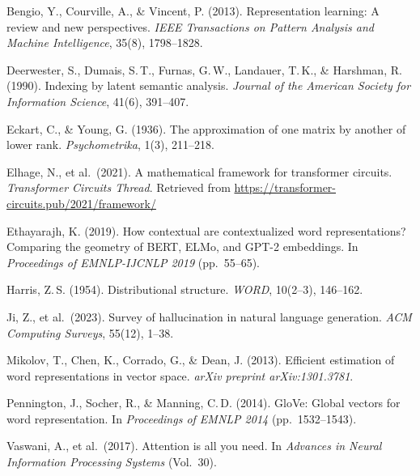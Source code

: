 \documentclass[12pt,a4paper]{article}
\begin{document}
\begin{enumerate}[label={[\arabic*]}, itemsep=6pt]
    \item Bengio, Y., Courville, A., \& Vincent, P. (2013). Representation learning: A review and
          new perspectives. \textit{IEEE Transactions on Pattern Analysis and Machine Intelligence},
          35(8), 1798--1828.

    \item Deerwester, S., Dumais, S.\,T., Furnas, G.\,W., Landauer, T.\,K., \& Harshman, R.
          (1990). Indexing by latent semantic analysis. \textit{Journal of the American Society for
          Information Science}, 41(6), 391--407.

    \item Eckart, C., \& Young, G. (1936). The approximation of one matrix by another of lower
          rank. \textit{Psychometrika}, 1(3), 211--218.

    \item Elhage, N., et al.\ (2021). A mathematical framework for transformer circuits.
          \textit{Transformer Circuits Thread}. Retrieved from
          \url{https://transformer-circuits.pub/2021/framework/}

    \item Ethayarajh, K. (2019). How contextual are contextualized word representations?
          Comparing the geometry of BERT, ELMo, and GPT-2 embeddings. In
          \textit{Proceedings of EMNLP-IJCNLP 2019} (pp.\ 55--65).

    \item Harris, Z.\,S. (1954). Distributional structure. \textit{WORD}, 10(2--3), 146--162.

    \item Ji, Z., et al.\ (2023). Survey of hallucination in natural language generation.
          \textit{ACM Computing Surveys}, 55(12), 1--38.

    \item Mikolov, T., Chen, K., Corrado, G., \& Dean, J. (2013). Efficient estimation of word
          representations in vector space. \textit{arXiv preprint arXiv:1301.3781}.

    \item Pennington, J., Socher, R., \& Manning, C.\,D. (2014). GloVe: Global vectors for word
          representation. In \textit{Proceedings of EMNLP 2014} (pp.\ 1532--1543).

    \item Vaswani, A., et al.\ (2017). Attention is all you need. In \textit{Advances in Neural
          Information Processing Systems} (Vol.\ 30).
\end{enumerate}
\end{document}
